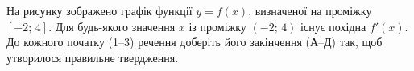 \documentclass[12pt]{article}
\begin{document}
\begin{samepage}
\par{}
\end{samepage}

\begin{samepage}
\noindent
\begin{minipage}[c]{0.56\textwidth}
\zadnum На рисунку зображено графік функції $y = f(x)$, визначеної на проміжку $[-2;\, 4]$. Для будь-якого значення $x$ із проміжку $(-2;\, 4)$ існує похідна $f'(x)$. До кожного початку \mbox{(1--3)} речення доберіть його закінчення \mbox{(А--Д)} так, щоб утворилося правильне твердження. \par
\end{minipage}%
\hfill
\begin{minipage}[c]{0.40\textwidth}
\centering
\begin{nmtfit}\begin{tikzpicture}[scale=0.5]%


\end{tikzpicture}
\end{nmtfit}
\end{minipage}
\end{samepage}
\end{document}
